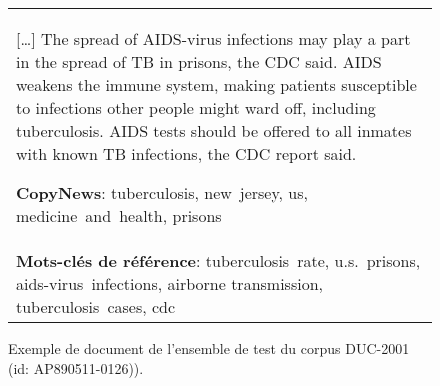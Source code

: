 \begin{figure}
{\begin{tabular}{|p{}|}
    [\ldots]
    The spread of \textcolor{color3}{AIDS-virus} \textcolor{color0}{infections} may play a part in the spread of TB in \textcolor{color6}{prisons}, the \textcolor{color5}{CDC} said.
    AIDS weakens the immune system, making patients susceptible to \textcolor{color0}{infections} other people might ward off, including \textcolor{color4}{tuberculosis}.
    AIDS tests should be offered to all inmates with known TB \textcolor{color0}{infections}, the \textcolor{color5}{CDC} report said.

    \vspace{0.9em}

    

    \vspace{1.1em}
    \textbf{CopyNews}: \textcolor{color4}{tuberculosis}, \textcolor{color2}{new~jersey}, us, medicine~and~\textcolor{color2}{health}, \textcolor{color6}{prisons} \\
    \textbf{Mots-clés de référence}: \textcolor{color4}{tuberculosis}~\textcolor{color8}{rate}, \textcolor{color7}{u.s}.~\textcolor{color6}{prisons}, \textcolor{color3}{aids-virus}~\textcolor{color0}{infections}, \textcolor{color9}{airborne transmission}, \textcolor{color4}{tuberculosis}~\textcolor{color1}{cases}, \textcolor{color5}{cdc}
    \vspace{0.2em}


    \end{tabular}%
    }
    \caption{Exemple de document de l'ensemble de test du corpus DUC-2001 (id: {\small AP890511-0126})).}
    \label{fig:ex_kptimes_duc}
\end{figure}
